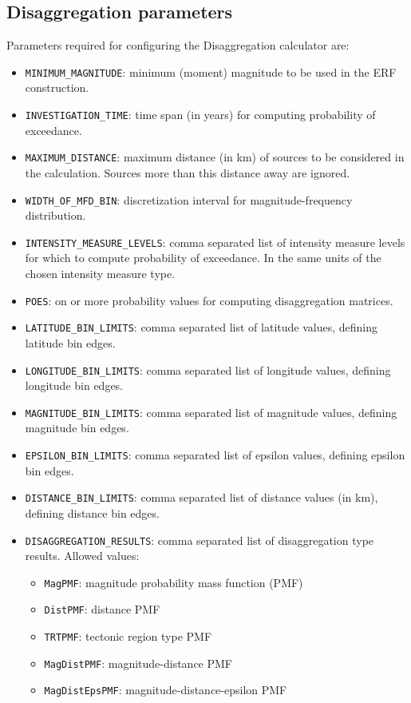 \subsection{Disaggregation parameters}
Parameters required for configuring the Disaggregation calculator are:
\begin{itemize}
\item \Verb+MINIMUM_MAGNITUDE+: minimum (moment) magnitude to be used in the ERF construction.
\item \Verb+INVESTIGATION_TIME+: time span (in years) for computing probability of exceedance.
\item \Verb+MAXIMUM_DISTANCE+: maximum distance (in km) of sources to be considered in the calculation. Sources more than this distance away are ignored.
\item \Verb+WIDTH_OF_MFD_BIN+: discretization interval for  magnitude-frequency distribution.
\item \Verb+INTENSITY_MEASURE_LEVELS+: comma separated list of intensity measure levels for which to compute probability of exceedance. In the same units of the chosen intensity measure type.
\item \Verb+POES+: on or more probability values for computing disaggregation matrices.
\item \Verb+LATITUDE_BIN_LIMITS+: comma separated list of latitude values, defining latitude bin edges.
\item \Verb+LONGITUDE_BIN_LIMITS+: comma separated list of longitude values, defining longitude bin edges.
\item \Verb+MAGNITUDE_BIN_LIMITS+: comma separated list of magnitude values, defining magnitude bin edges.
\item \Verb+EPSILON_BIN_LIMITS+: comma separated list of epsilon values, defining epsilon bin edges.
\item \Verb+DISTANCE_BIN_LIMITS+: comma separated list of distance values (in km), defining distance bin edges.
\item \Verb+DISAGGREGATION_RESULTS+: comma separated list of disaggregation type results. Allowed values:
\begin{itemize}
\item \Verb+MagPMF+: magnitude probability mass function (PMF)
\item \Verb+DistPMF+: distance PMF
\item \Verb+TRTPMF+: tectonic region type PMF
\item \Verb+MagDistPMF+: magnitude-distance PMF
\item \Verb+MagDistEpsPMF+: magnitude-distance-epsilon PMF

\end{itemize}
\end{itemize}
